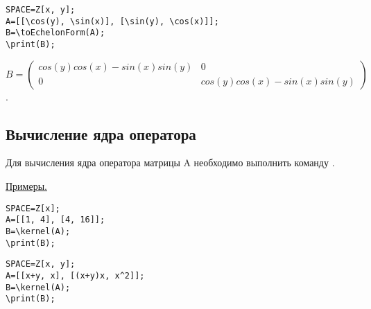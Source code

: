 \begin{verbatim}
SPACE=Z[x, y]; 
A=[[\cos(y), \sin(x)], [\sin(y), \cos(x)]];
B=\toEchelonForm(A); 
\print(B);
\end{verbatim}

{$B =\left(\begin{array}{cc} cos(y) cos(x)- sin(x) sin(y) &0\\ 0 & cos(y) cos(x)- sin(x) sin(y) \end{array}\right)$.} 
 
 \subsection{Вычисление ядра оператора}

 Для вычисления ядра оператора матрицы A необходимо выполнить команду
. 

\underline{Примеры. }

\vspace*{-2mm}
\begin{verbatim}
SPACE=Z[x]; 
A=[[1, 4], [4, 16]];
B=\kernel(A); 
\print(B);
\end{verbatim}


\begin{verbatim}
SPACE=Z[x, y]; 
A=[[x+y, x], [(x+y)x, x^2]];
B=\kernel(A); 
\print(B);
\end{verbatim}

